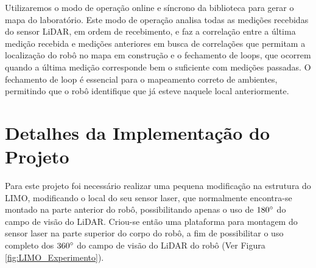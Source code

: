     Utilizaremos o modo de operação online e síncrono da biblioteca para gerar o mapa do laboratório. Este modo de operação analisa todas as medições recebidas do sensor LiDAR, em ordem de recebimento, e faz a correlação entre a última medição recebida e medições anteriores em busca de correlações que permitam a localização do robô no mapa em construção e o fechamento de loops, que ocorrem quando a última medição corresponde bem o suficiente com medições passadas. O fechamento de loop é essencial para o mapeamento correto de ambientes, permitindo que o robô identifique que já esteve naquele local anteriormente.

    
    


    
\section{Detalhes da Implementação do Projeto}

    Para este projeto foi necessário realizar uma pequena modificação na estrutura do LIMO, modificando o local do seu sensor laser, que normalmente encontra-se montado na parte anterior do robô, possibilitando apenas o uso de $180\degree$ do campo de visão do LiDAR. Criou-se então uma plataforma para montagem do sensor laser na parte superior do corpo do robô, a fim de possibilitar o uso completo dos $360\degree$ do campo de visão do LiDAR do robô (Ver Figura \ref{fig:LIMO_Experimento}). 
    
